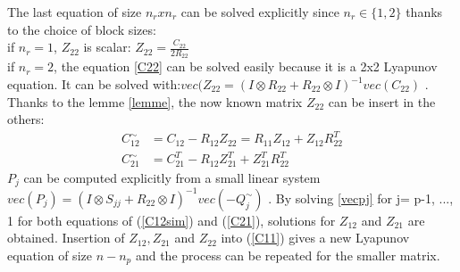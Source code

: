 \documentclass[11pt]{article}
\begin{document}
The last equation of size $n_{r} x n_{r}$ can be solved explicitly since $n_{r} \in \{1, 2\}$ thanks to the choice of block sizes:\\
if $n_{r} = 1$, $Z_{22}$ is scalar: $Z_{22} = \frac{C_{22}}{2 R_{22}}$ \label{Y22} \\
if $n_{r} = 2$, the equation \ref{C22} can be solved easily because it is a 2x2 Lyapunov equation. It can be solved with:$vec(Z_{22} = (I \otimes R_{22} + R_{22} \otimes I)^{-1} vec(C_{22})$ \label{vecY22}.\\
Thanks to the lemme \ref{lemme}, the now known matrix $Z_{22}$ can be insert in the others:\\
\begin{align}
C_{12}^{\sim} &= C_{12} - R_{12} Z_{22} = R_{11} Z_{12} + Z_{12} R_{22}^{T} \label{C12sim} \\ 
C_{21}^{\sim} &= C_{21}^{T} - R_{12} Z_{21}^{T} + Z_{21}^{T} R_{22}^{T} \label{C21sim}
\end{align}
$P_{j}$ can be computed explicitly from a small linear system $vec(P_j) = (I \otimes S_{jj} + R_{22} \otimes I)^{-1} vec(-Q_{j}^{\sim})$ \label{vecpj}. By solving \ref{vecpj} for j= p-1, ..., 1 for both equations of (\ref{C12sim}) and (\ref{C21}), solutions for $Z_{12}$ and $Z_{21}$ are obtained. Insertion of $Z_{12}, Z_{21}$ and $Z_{22}$ into (\ref{C11}) gives a new Lyapunov equation of size $n-n_{p}$ and the process can be repeated for the smaller matrix.
\end{document}
